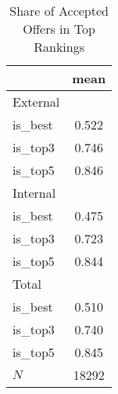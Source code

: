 \begin{table}[htbp]\centering
\def\sym#1{\ifmmode^{#1}\else\(^{#1}\)\fi}
\caption{Share of Accepted Offers in Top Rankings}
\begin{tabular}{l*{1}{c}}
\hline\hline
            &        mean\\
\hline
External    &            \\
is\_best     &       0.522\\
is\_top3     &       0.746\\
is\_top5     &       0.846\\
\hline
Internal    &            \\
is\_best     &       0.475\\
is\_top3     &       0.723\\
is\_top5     &       0.844\\
\hline
Total       &            \\
is\_best     &       0.510\\
is\_top3     &       0.740\\
is\_top5     &       0.845\\
\hline
\(N\)       &       18292\\
\hline\hline
\end{tabular}
\end{table}
